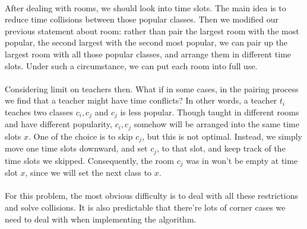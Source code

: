 \documentclass[11pt, oneside]{article}   	%
\begin{document}
\\ After dealing with rooms, we should look into time slots. The main idea is to reduce time collisions between those popular classes. Then we modified our previous statement about room: rather than pair the largest room with the most popular, the second largest with the second most popular, we can pair up the largest room with all those popular classes, and arrange them in different time slots. Under such a circumstance, we can put each room into full use.\\
\\Considering limit on teachers then. What if in some cases, in the pairing process we find that a teacher might have time conflicts? In other words, a teacher $t_i$ teaches two classes $c_i,c_j$ and $c_j$ is less popular. Though taught in different rooms and have different popularity, $c_i,c_j$ somehow will be arranged into the same time slots $x$. One of the choice is to skip $c_j$, but this is not optimal. Instead, we simply move one time slots downward, and set $c_j$, to that slot, and keep track of the time slots we skipped. Consequently, the room $c_j$ was in won't be empty at time slot $x$, since we will set the next class to $x$.\\
\\For this problem, the most obvious difficulty is to deal with all these restrictions and solve collisions. It is also predictable that there're lots of corner cases we need to deal with when implementing the algorithm. 
\end{document}
